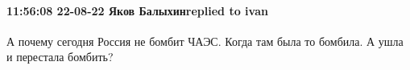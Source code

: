  
 
 
 
 

\paragraph{11:56:08 22-08-22 Яков Балыхинreplied to ivan}

А почему сегодня Россия не бомбит ЧАЭС. Когда там была то бомбила. А ушла и
перестала бомбить?
